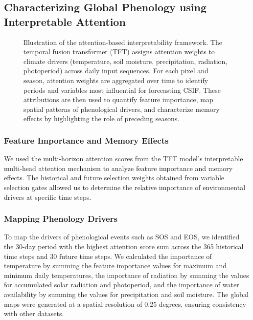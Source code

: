 \documentclass[pdflatex,sn-mathphys-num]{sn-jnl}%
\theoremstyle{thmstyleone}%
\theoremstyle{thmstyletwo}%
\theoremstyle{thmstylethree}%
\begin{document}
\subsection{Characterizing Global Phenology using Interpretable Attention}\label{subsec2}
\begin{figure}[h!]
        \centering
        
        \caption{Illustration of the attention-based interpretability framework. The temporal fusion transformer (TFT) assigns attention weights to climate drivers (temperature, soil moisture, precipitation, radiation, photoperiod) across daily input sequences. For each pixel and season, attention weights are aggregated over time to identify periods and variables most influential for forecasting CSIF. These attributions are then used to quantify feature importance, map spatial patterns of phenological drivers, and characterize memory effects by highlighting the role of preceding seasons.}
        \label{fig:attention}
    \end{figure}

\subsubsection{Feature Importance and Memory Effects}\label{subsubsec2}
We used the multi-horizon attention scores from the TFT model's interpretable multi-head attention mechanism to analyze feature importance and memory effects. The historical and future selection weights obtained from variable selection gates allowed us to determine the relative importance of environmental drivers at specific time steps.

\subsubsection{Mapping Phenology Drivers}\label{subsubsec2}
To map the drivers of phenological events such as SOS and EOS, we identified the 30-day period with the highest attention score sum across the 365 historical time steps and 30 future time steps. We calculated the importance of temperature by summing the feature importance values for maximum and minimum daily temperatures, the importance of radiation by summing the values for accumulated solar radiation and photoperiod, and the importance of water availability by summing the values for precipitation and soil moisture. The global maps were generated at a spatial resolution of 0.25 degrees, ensuring consistency with other datasets.
\end{document}
